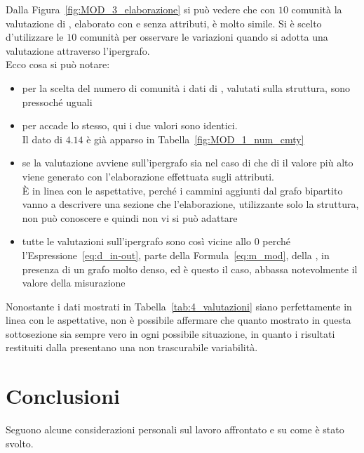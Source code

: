 %
Dalla Figura~\ref{fig:MOD_3_elaborazione} si può vedere che con $10$ comunità la valutazione di \cora, elaborato con e senza attributi, è molto simile. Si è scelto d'utilizzare le $10$ comunità per osservare le variazioni quando si adotta una valutazione attraverso l'ipergrafo.\\
Ecco cosa si può notare:
\begin{itemize}
	\item per la scelta del numero di comunità i dati di \cora, valutati sulla struttura, sono pressoché uguali
	\item per \citeseer accade lo stesso, qui i due valori sono identici.\\
	Il dato di $4.14$  è già apparso in Tabella~\ref{fig:MOD_1_num_cmty}
	\item se la valutazione avviene sull'ipergrafo sia nel caso di \cora che di \citeseer il valore più alto viene generato con l'elaborazione effettuata sugli attributi.\\
	È in linea con le aspettative, perché i cammini aggiunti dal grafo bipartito vanno a descrivere una sezione che l'elaborazione, utilizzante solo la struttura, non può conoscere e quindi non vi si può adattare
	\item tutte le valutazioni sull'ipergrafo sono così vicine allo $0$ perché l'Espressione~\ref{eq:d_in-out}, parte della Formula~\ref{eq:m_mod}, della \mmod, in presenza di un grafo molto denso, ed è questo il caso, abbassa notevolmente il valore della misurazione
\end{itemize}
%
Nonostante i dati mostrati in Tabella~\ref{tab:4_valutazioni} siano perfettamente in linea con le aspettative, non è possibile affermare che quanto mostrato in questa sottosezione sia sempre vero in ogni possibile situazione, in quanto i risultati restituiti dalla \mmod presentano una non trascurabile variabilità.



\chapter{Conclusioni}\label{chap:4}
Seguono alcune considerazioni personali sul lavoro affrontato e su come è stato svolto.
